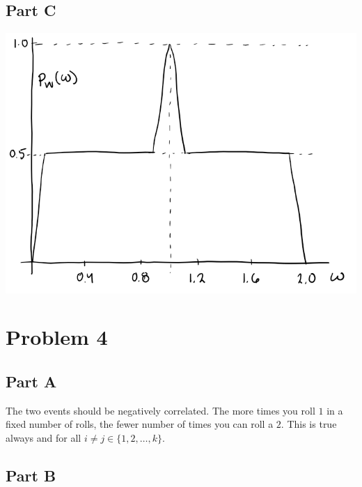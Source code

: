 \documentclass{article}
\begin{document}
\subsection*{Part C}

\begin{center}
    \includegraphics[scale=0.5]{Images/P3C.PNG}
\end{center}

\section*{Problem 4}

\subsection*{Part A}

The two events should be negatively correlated. The more times you roll $1$
in a fixed number of rolls, the fewer number of times you can roll a $2$.
This is true always and for all $i \neq j \in \{1, 2, \ldots, k\}$.

\subsection*{Part B}
\end{document}
